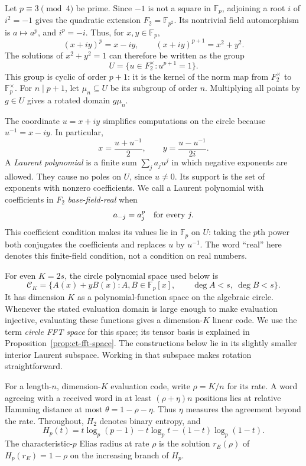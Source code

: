 \documentclass[11pt,letterpaper]{article}
\theoremstyle{definition}
\theoremstyle{remark}
\begin{document}
Let $p\equiv3\pmod4$ be prime. Since $-1$ is not a square in
$\mathbb F_p$, adjoining a root $i$ of $i^2=-1$ gives the quadratic
extension $F_2=\mathbb F_{p^2}$. Its nontrivial field automorphism is
$a\mapsto a^p$, and $i^p=-i$. Thus, for $x,y\in\mathbb F_p$,
\[
 (x+iy)^p=x-iy,\qquad (x+iy)^{p+1}=x^2+y^2.
\]
The solutions of $x^2+y^2=1$ can therefore be written as the group
\[
 U=\{u\in F_2^\times:u^{p+1}=1\}.
\]
This group is cyclic of order $p+1$: it is the kernel of the norm map
from $F_2^\times$ to $\mathbb F_p^\times$. For $n\mid p+1$, let
$\mu_n\subseteq U$ be its subgroup of order $n$. Multiplying all points
by $g\in U$ gives a rotated domain $g\mu_n$.

The coordinate $u=x+iy$ simplifies computations on the circle because
$u^{-1}=x-iy$. In particular,
\[
 x=\frac{u+u^{-1}}2,\qquad y=\frac{u-u^{-1}}{2i}.
\]
A \emph{Laurent polynomial} is a finite sum $\sum_j a_j u^j$ in which
negative exponents are allowed. They cause no poles on $U$, since
$u\ne0$. Its support is the set of exponents with nonzero coefficients.
We call a Laurent polynomial with coefficients in $F_2$
\emph{base-field-real} when
\[
 a_{-j}=a_j^p\quad\hbox{for every }j.
\]
This coefficient condition makes its values lie in $\mathbb F_p$ on
$U$: taking the $p$th power both conjugates the coefficients and replaces
$u$ by $u^{-1}$. The word ``real'' here denotes this finite-field
condition, not a condition on real numbers.

For even $K=2s$, the circle polynomial space used below is
\[
 \mathcal C_K=\{A(x)+yB(x):A,B\in\mathbb F_p[x],\qquad
 \deg A<s,\ \deg B<s\}.
\]
It has dimension $K$ as a polynomial-function space on the algebraic
circle. Whenever the stated evaluation domain is large enough to make
evaluation injective, evaluating these functions gives a dimension-$K$
linear code. We use the term \emph{circle FFT space} for this space;
its tensor basis is explained in Proposition~\ref{prop:ct-fft-space}.
The constructions below lie in its slightly smaller interior Laurent
subspace. Working in that subspace makes rotation straightforward.

For a length-$n$, dimension-$K$ evaluation code, write $\rho=K/n$ for
its rate. A word agreeing with a received word in at least
$(\rho+\eta)n$ positions lies at relative Hamming distance at most
$\theta=1-\rho-\eta$. Thus $\eta$ measures the agreement beyond the
rate. Throughout, $H_2$ denotes binary entropy, and
\[
 H_p(t)=t\log_p(p-1)-t\log_p t-(1-t)\log_p(1-t).
\]
The characteristic-$p$ Elias radius at rate $\rho$ is the solution
$r_E(\rho)$ of $H_p(r_E)=1-\rho$ on the increasing branch of $H_p$.
\end{document}
